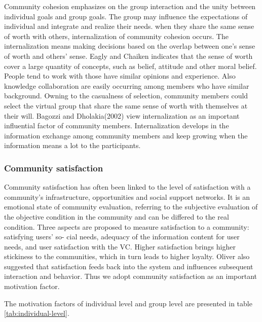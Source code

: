 \documentclass{elsarticle}
\begin{document}
Community cohesion emphasizes on the group interaction and the
unity between individual goals and group goals. The group may influence
the expectations of individual and  integrate and realize their
needs. when they share the same sense of
worth with others, internalization of community cohesion occurs.
 The
internalization means making decisions based on the overlap between
one’s sense of worth and others’ sense. Eagly and Chaiken indicates that the
sense of worth cover a large quantity of concepts, such as belief,
attitude and other moral belief\cite{eagly1993pa}. People tend to work
with those have similar opinions and experience. Also knowledge
collaboration are easily occurring among members who have similar background.  Owning to the casualness of selection,
community members could select the virtual group that share
the same sense of worth with themselves at their will. Bagozzi and Dholakia(2002)
view internalization as an important influential factor of community
members\cite{richard_p._bagozzi_intentional_2002}. Internalization develops in the information exchange among
community members and keep growing when the information means a lot to
the participants. 

\subsubsection{Community satisfaction}
\label{sec:comm-satisf}

Community satisfaction has often been linked to the level of satisfaction with a
community’s infrastructure,  opportunities and social support networks\cite{filkins2000predicting}. It is an emotional state of community
evaluation, referring to the
subjective evaluation of the objective condition in the community and
can be differed to the real condition. Three aspects are proposed to
measure satisfaction to a community: satisfying users’ so-
cial needs, adequacy of the information content for
user needs, and user satisfaction with the VC\cite{lin2006determinants}. Higher satisfaction brings
higher stickiness to the communities, which in turn leads to higher
loyalty\cite{linhsiufen2008}. Oliver also suggested that satisfaction
feeds back into the system and influences subsequent interaction and
behavior\cite{oliver1980cognitive}. Thus we adopt community
satisfaction as an important motivation factor.

The motivation factors of  individual level and group level are presented in table \ref{tab:individual-level}.
\end{document}
